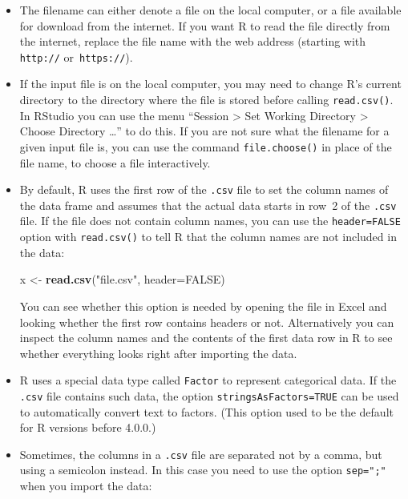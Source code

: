 \documentclass[
  a4paper,
]{article}
\newenvironment{Shaded}{\begin{snugshade}}{\end{snugshade}}
\newcommand{\AttributeTok}[1]{\textcolor[rgb]{0.13,0.29,0.53}{#1}}
\newcommand{\ConstantTok}[1]{\textcolor[rgb]{0.56,0.35,0.01}{#1}}
\newcommand{\FunctionTok}[1]{\textcolor[rgb]{0.13,0.29,0.53}{\textbf{#1}}}
\newcommand{\NormalTok}[1]{#1}
\newcommand{\OtherTok}[1]{\textcolor[rgb]{0.56,0.35,0.01}{#1}}
\newcommand{\StringTok}[1]{\textcolor[rgb]{0.31,0.60,0.02}{#1}}
\theoremstyle{definition}
\theoremstyle{definition}
\theoremstyle{definition}
\theoremstyle{definition}
\theoremstyle{remark}
\begin{document}
\begin{itemize}
\item
  The filename can either denote a file on the local computer, or
  a file available for download from the internet. If you want R to read the
  file directly from the internet, replace the file name with the web address
  (starting with \texttt{http://} or~\texttt{https://}).
\item
  If the input file is on the local computer, you may
  need to change R's current directory to the directory where the file is
  stored before calling \texttt{read.csv()}. In RStudio you can use the menu
  ``Session \textgreater{} Set Working Directory \textgreater{} Choose Directory \ldots{}'' to do this. If you
  are not sure what the filename for a given input file is, you can use the
  command \texttt{file.choose()} in place of the file name, to choose a file
  interactively.
\item
  By default, R uses the first row of the \texttt{.csv} file to set
  the column names of the data frame and assumes that the actual data
  starts in row~2 of the \texttt{.csv} file. If the file does not
  contain column names, you can use the \texttt{header=FALSE} option
  with \texttt{read.csv()} to tell R that the column names are not
  included in the data:

\begin{Shaded}
\begin{Highlighting}[]
\NormalTok{  x }\OtherTok{\textless{}{-}} \FunctionTok{read.csv}\NormalTok{(}\StringTok{"file.csv"}\NormalTok{, }\AttributeTok{header=}\ConstantTok{FALSE}\NormalTok{)}
\end{Highlighting}
\end{Shaded}

  You can see whether this option is needed by opening the file in
  Excel and looking whether the first row contains headers or not.
  Alternatively you can inspect the column names and the contents of
  the first data row in R to see whether everything looks right after
  importing the data.
\item
  R uses a special data type called \texttt{Factor} to represent categorical
  data. If the \texttt{.csv} file contains such data, the option
  \texttt{stringsAsFactors=TRUE} can be used to automatically convert
  text to factors. (This option used to be the default for R versions
  before 4.0.0.)
\item
  Sometimes, the columns in a \texttt{.csv} file are separated not
  by a comma, but using a semicolon instead. In this case you
  need to use the option \texttt{sep=";"} when you import the data:


\end{itemize}
\end{document}
